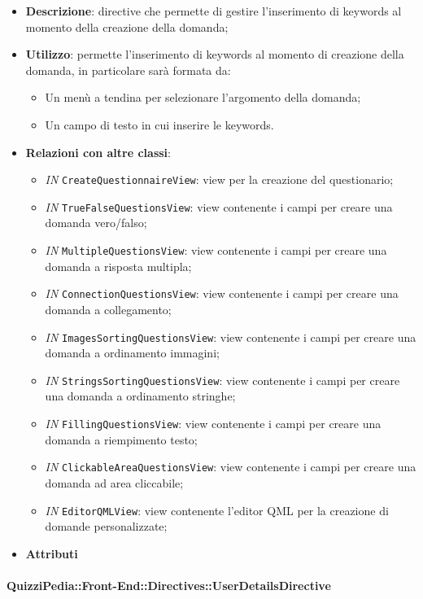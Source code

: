 \begin{itemize}
	\item \textbf{Descrizione}: directive che permette di gestire l'inserimento di keywords al momento della creazione della domanda;
	\item \textbf{Utilizzo}: permette l'inserimento di keywords al momento di creazione della domanda, in particolare sarà formata da:
	\begin{itemize}
		\item Un menù a tendina per selezionare l'argomento della domanda;
		\item Un campo di testo in cui inserire le keywords.
	\end{itemize}
	\item \textbf{Relazioni con altre classi}:
	\begin{itemize}
		\item \textit{IN} \texttt{CreateQuestionnaireView}: view per la creazione del questionario; 
		\item \textit{IN} \texttt{TrueFalseQuestionsView}: view contenente i campi per creare una domanda vero/falso; 
		\item \textit{IN} \texttt{MultipleQuestionsView}: view contenente i campi per creare una domanda a risposta multipla;
		\item \textit{IN} \texttt{ConnectionQuestionsView}: view contenente i campi per creare una domanda a collegamento;
		\item \textit{IN} \texttt{ImagesSortingQuestionsView}: view contenente i campi per creare una domanda a ordinamento immagini;
		\item \textit{IN} \texttt{StringsSortingQuestionsView}: view contenente i campi per creare una domanda a ordinamento stringhe;
		\item \textit{IN} \texttt{FillingQuestionsView}: view contenente i campi per creare una domanda a riempimento testo;
		\item \textit{IN} \texttt{ClickableAreaQuestionsView}: view contenente i campi per creare una domanda ad area cliccabile;
		\item \textit{IN} \texttt{EditorQMLView}: view contenente l'editor QML per la creazione di domande personalizzate;
	\end{itemize}
	\item \textbf{Attributi}
\end{itemize}

\paragraph{QuizziPedia::Front-End::Directives::UserDetailsDirective}


